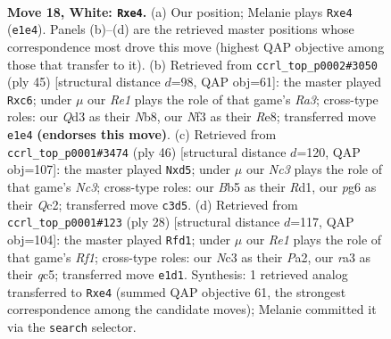 \documentclass[11pt]{article}
\begin{document}
\clearpage

\begin{figure}[p]\centering
\begin{subfigure}{0.46\textwidth}\centering
\resizebox{\linewidth}{!}{%
\newchessgame
\chessboard[
  setfen={1nbq1r1k/5p2/1p2p1p1/1B1p3p/3Pn3/r1NQ1NP1/P1P2PP1/2R1RK2 w - - 4 18},
  showmover=false,
  pgfstyle=straightmove, color=movearrow, markmove={e1-e4}
]}
\caption{}
\end{subfigure}\hfill
\begin{subfigure}{0.46\textwidth}\centering
\resizebox{\linewidth}{!}{%
\newchessgame
\chessboard[
  setfen={1n2r1k1/4qpp1/r1Np1n2/p6p/Np2PP1P/1P1Q2P1/P5B1/R3R1K1 b - - 0 23},
  showmover=false,
  pgfstyle=straightmove, color=movearrow, markmove={a6-c6}
]}
\caption{}
\end{subfigure}
\\[4pt]
\begin{subfigure}{0.46\textwidth}\centering
\resizebox{\linewidth}{!}{%
\newchessgame
\chessboard[
  setfen={1r1qr1k1/1bp2pp1/p3p2p/3nN3/1bBP1P1P/2N3P1/P1Q2P2/3RR1K1 w - - 5 24},
  showmover=false,
  pgfstyle=straightmove, color=movearrow, markmove={c3-d5}
]}
\caption{}
\end{subfigure}\hfill
\begin{subfigure}{0.46\textwidth}\centering
\resizebox{\linewidth}{!}{%
\newchessgame
\chessboard[
  setfen={1n2k2r/1p4pp/2p1bp2/2qnp3/8/r1N1PN2/P1QPBPPP/R4RK1 w k - 5 15},
  showmover=false,
  pgfstyle=straightmove, color=movearrow, markmove={f1-d1}
]}
\caption{}
\end{subfigure}
\caption{\textbf{Move 18, White: \texttt{Rxe4}.} (a) Our position; Melanie plays \texttt{Rxe4} (\texttt{e1e4}). Panels (b)--(d) are the retrieved master positions whose correspondence most drove this move (highest QAP objective among those that transfer to it). (b) Retrieved from \texttt{ccrl\_top\_p0002\#3050} (ply 45) [structural distance $d$=98, QAP obj=61]: the master played \texttt{Rxc6}; under $\mu$ our \emph{Re1} plays the role of that game's \emph{Ra3}; cross-type roles: our \emph{Q}d3 as their \emph{N}b8, our \emph{N}f3 as their \emph{R}e8; transferred move \texttt{e1e4} \textbf{(endorses this move)}. (c) Retrieved from \texttt{ccrl\_top\_p0001\#3474} (ply 46) [structural distance $d$=120, QAP obj=107]: the master played \texttt{Nxd5}; under $\mu$ our \emph{Nc3} plays the role of that game's \emph{Nc3}; cross-type roles: our \emph{B}b5 as their \emph{R}d1, our \emph{p}g6 as their \emph{Q}c2; transferred move \texttt{c3d5}. (d) Retrieved from \texttt{ccrl\_top\_p0001\#123} (ply 28) [structural distance $d$=117, QAP obj=104]: the master played \texttt{Rfd1}; under $\mu$ our \emph{Re1} plays the role of that game's \emph{Rf1}; cross-type roles: our \emph{N}c3 as their \emph{P}a2, our \emph{r}a3 as their \emph{q}c5; transferred move \texttt{e1d1}. Synthesis: 1 retrieved analog transferred to \texttt{Rxe4} (summed QAP objective 61, the strongest correspondence among the candidate moves); Melanie committed it via the \texttt{search} selector.}
\label{fig:thought-m34}
\end{figure}
\end{document}
